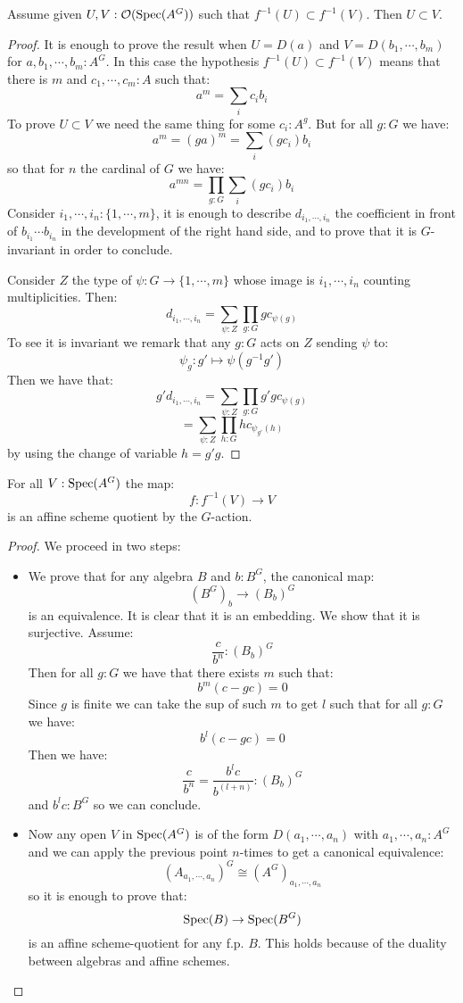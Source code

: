 \begin{lemma}\label{injective-on-open}
Assume given $U,V:\mathcal{O}(\operatorname{Spec}(A^G))$ such that $f^{-1}(U) \subset f^{-1}(V)$. Then $U\subset V$. 
\end{lemma}

\begin{proof}
It is enough to prove the result when $U = D(a)$ and $V=D(b_1,\cdots,b_m)$ for $a,b_1,\cdots,b_m:A^G$. In this case the hypothesis $f^{-1}(U) \subset f^{-1}(V)$ means that there is $m$ and $c_1,\cdots,c_m:A$ such that:
\[a^m = \sum_{i}c_ib_i\]
To prove $U\subset V$ we need the same thing for some $c_i:A^g$. But for all $g:G$ we have:
\[a^m = (ga)^m = \sum_{i}(gc_i)b_i\]
so that for $n$ the cardinal of $G$ we have:
\[a^{mn} = \prod_{g:G} \sum_{i}(gc_i)b_i\]
Consider $i_1,\cdots,i_n: \{1,\cdots,m\}$, it is enough to describe $d_{i_1,\cdots,i_n}$ the coefficient in front of $b_{i_1}\cdots b_{i_n}$ in the development of the right hand side, and to prove that it is $G$-invariant in order to conclude. 

Consider $Z$ the type of $\psi:G\to \{1,\cdots,m\}$ whose image is $i_1,\cdots,i_n$ counting multiplicities. Then:
\[d_{i_1,\cdots,i_n} = \sum_{\psi: Z} \prod_{g:G} gc_{\psi(g)} \]
To see it is invariant we remark that any $g:G$ acts on $Z$ sending $\psi$ to:
\[\psi_g : g' \mapsto \psi(g^{-1}g')\]
Then we have that:
\[g'd_{i_1,\cdots,i_n} =  \sum_{\psi: Z} \prod_{g:G} g'gc_{\psi(g)}\]
\[ = \sum_{\psi: Z} \prod_{h:G} hc_{\psi_{g'}(h)}\]
by using the change of variable $h=g'g$.
\end{proof}

\begin{lemma}\label{affine-scheme-quotient-on-open}
For all $V:\operatorname{Spec}(A^G)$ the map:
\[f : f^{-1}(V) \to V\]
is an affine scheme quotient by the $G$-action.
\end{lemma}

\begin{proof}
We proceed in two steps:
\begin{itemize}
\item We prove that for any algebra $B$ and $b:B^G$, the canonical map:
\[(B^G)_b\to (B_b)^G \]
is an equivalence. It is clear that it is an embedding. We show that it is surjective. Assume:
\[\frac{c}{b^n} : (B_b)^G\]
Then for all $g:G$ we have that there exists $m$ such that:
\[b^m(c-gc) = 0\]
Since $g$ is finite we can take the sup of such $m$ to get $l$ such that for all $g:G$ we have:
\[b^l(c-gc) = 0\]
Then we have:
\[\frac{c}{b^n} = \frac{b^lc}{b^(l+n)} : (B_b)^G\]
and $b^lc : B^G$ so we can conclude.
\item Now any open $V$ in $\operatorname{Spec}(A^G)$ is of the form $D(a_1,\cdots,a_n)$ with $a_1,\cdots,a_n:A^G$ and we can apply the previous point $n$-times to get a canonical equivalence:
\[(A_{a_1,\cdots,a_n})^G \cong (A^G)_{a_1,\cdots,a_n}\]
so it is enough to prove that:
\[ \operatorname{Spec}(B)\to \operatorname{Spec}(B^G)\]
is an affine scheme-quotient for any f.p. $B$. This holds because of the duality between algebras and affine schemes.
\end{itemize}
\end{proof}

